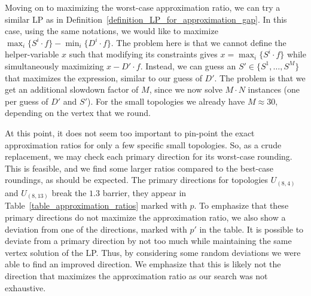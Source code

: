 Moving on to maximizing the worst-case approximation ratio, we can try a similar LP as in Definition~\ref{definition_LP_for_approximation_gap}. In this case, using the same notations, we would like to maximize $\max_{i}\{S^i \cdot f\} - \min_{i}\{D^i \cdot f\}$. The problem here is that we cannot define the helper-variable $x$ such that modifying its constraints gives $x = \max_{i}\{S^i \cdot f\}$ while simultaneously maximizing $x - D' \cdot f$. Instead, we can guess an $S' \in \{ S^1,\ldots,S^M\}$ that maximizes the expression, similar to our guess of $D'$. The problem is that we get an additional slowdown factor of $M$, since we now solve $M \cdot N$ instances (one per guess of $D'$ and $S'$). For the small topologies we already have $M \approx 30$, depending on the vertex that we round.

At this point, it does not seem too important to pin-point the exact approximation ratios for only a few specific small topologies. So, as a crude replacement, we may check each primary direction for its worst-case rounding. This is feasible, and we find some larger ratios compared to the best-case roundings, as should be expected. The primary directions for topologies $U_{(8,4)}$ and $U_{(8,13)}$ break the $1.3$ barrier, 
they appear in Table~\ref{table_approximation_ratios} marked with ${p}$. To emphasize that these primary directions do not maximize the approximation ratio, we also show a deviation from one of the directions, marked with ${p'}$ in the table. It is possible to deviate from a primary direction by not too much while maintaining the same vertex solution of the LP. Thus, by considering some random deviations we were able to find an improved direction. We emphasize that this is likely not the direction that maximizes the approximation ratio as our search was not exhaustive.